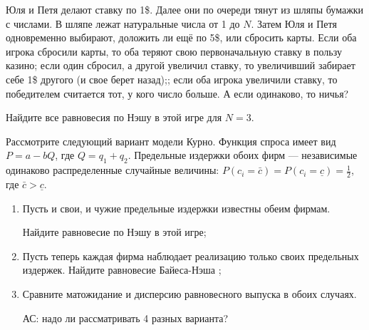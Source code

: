 \begin{problem}
Юля и Петя делают ставку по 1\$. Далее они по очереди тянут из шляпы бумажки с числами. В шляпе лежат натуральные числа от 1 до  $N$. Затем Юля и Петя одновременно выбирают, доложить ли ещё по 5\$, или сбросить карты. Если оба игрока сбросили карты, то оба теряют свою первоначальную ставку в пользу казино; если один сбросил, а другой увеличил ставку, то увеличивший забирает себе 1\$ другого (и свое берет назад);; если оба игрока увеличили ставку, то победителем считается тот, у кого число больше. {\red А если одинаково, то ничья?}\par
Найдите все равновесия по Нэшу в этой игре для  $N=3$.\par



\begin{sol}

\end{sol}
\end{problem}



\begin{problem}
\begin{source}
\cite{colell:mt}
\end{source}
Рассмотрите следующий вариант модели Курно. Функция спроса имеет вид  $P=a-bQ$, где  $Q=q_{1} +q_{2} $. Предельные издержки обоих фирм — независимые одинаково распределенные случайные величины:  $P\left(c_{i} =\bar{c}\right)=P\left(c_{i} =\underline{c}\right)=\frac{1}{2} $, где  $\bar{c}>\underline{c}$.\par

\begin{enumerate}
\item
Пусть и свои, и чужие предельные издержки известны обеим фирмам.\par
Найдите равновесие по Нэшу в этой игре;\par

\item Пусть теперь каждая фирма наблюдает реализацию только своих предельных издержек.
	Найдите равновесие Байеса-Нэша  ;\par
\item 	Сравните матожидание и дисперсию равновесного выпуска в обоих случаях.\par

{\red АС: надо ли рассматривать 4 разных варианта?}
\end{enumerate}


\begin{sol}

\end{sol}
\end{problem}






